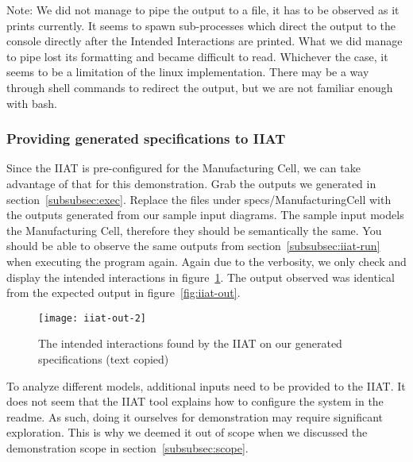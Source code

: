    Note: We did not manage to pipe the output to a file, it has to be observed as it prints currently.
    It seems to spawn sub-processes which direct the output to the console directly after the Intended Interactions are printed.
    What we did manage to pipe lost its formatting and became difficult to read.
    Whichever the case, it seems to be a limitation of the linux implementation.
    There may be a way through shell commands to redirect the output, but we are not familiar enough with bash.

    \subsubsection{Providing generated specifications to IIAT}
    Since the IIAT is pre-configured for the Manufacturing Cell,
    we can take advantage of that for this demonstration.
    Grab the outputs we generated in section~\ref{subsubsec:exec}.
    Replace the files under specs/ManufacturingCell with the outputs generated from our sample input diagrams.
    The sample input models the Manufacturing Cell, therefore they should be semantically the same.
    You should be able to observe the same outputs from section~\ref{subsubsec:iiat-run} when executing the program again.
    Again due to the verbosity, we only check and display the intended interactions in figure~\ref{fig:iiat-out2}.
    The output observed was identical from the expected output in figure~\ref{fig:iiat-out}.
    \begin{figure}[h]
        \centering
        \texttt{[image: iiat-out-2]}
        \caption{The intended interactions found by the IIAT on our generated specifications (text copied)}
        \label{fig:iiat-out2}
    \end{figure}
    To analyze different models, additional inputs need to be provided to the IIAT\@.
    It does not seem that the IIAT tool explains how to configure the system in the readme.
    As such, doing it ourselves for demonstration may require significant exploration.
    This is why we deemed it out of scope when we discussed the demonstration scope in section~\ref{subsubsec:scope}.